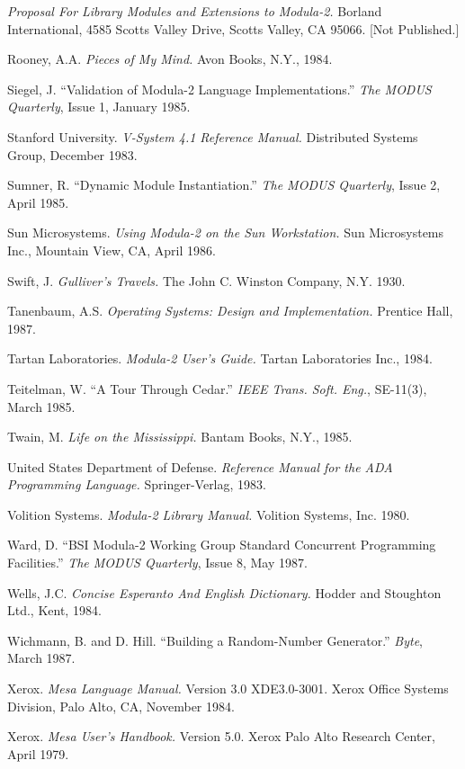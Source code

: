 {\em Proposal For Library Modules and Extensions to Modula-2.} Borland
International, 4585 Scotts Valley Drive, Scotts Valley, CA 95066. [Not
Published.]
\smallskip

Rooney, A.A. {\em Pieces of My Mind.} Avon Books, N.Y., 1984.
\smallskip

Siegel, J. ``Validation of Modula-2 Language Implementations.''
{\em The MODUS Quarterly}, Issue 1, January 1985.
\smallskip 

Stanford University.  {\em V-System 4.1 Reference Manual.} Distributed 
Systems Group, December 1983.
\smallskip

Sumner, R. ``Dynamic Module Instantiation.'' {\em The MODUS Quarterly}, 
Issue 2, April 1985.  
\smallskip

Sun Microsystems. {\em Using Modula-2 on the Sun Workstation.} Sun 
Microsystems Inc., Mountain View, CA, April 1986.
\smallskip

Swift, J. {\em Gulliver's Travels.} The John C. Winston Company, N.Y. 1930.
\smallskip

Tanenbaum, A.S.  {\em Operating Systems: Design and Implementation.}
Prentice Hall, 1987.
\smallskip

Tartan Laboratories.  {\em Modula-2 User's Guide.} Tartan Laboratories 
Inc., 1984.
\smallskip

Teitelman, W. ``A Tour Through Cedar.'' {\em IEEE Trans. Soft. Eng.}, SE-11(3), 
March 1985.
\smallskip

Twain, M. {\em Life on the Mississippi.} Bantam Books, N.Y., 1985.
\smallskip

United States Department of Defense.  {\em Reference Manual for the ADA
Programming Language.} Springer-Verlag, 1983.
\smallskip

Volition Systems. {\em Modula-2 Library Manual.} Volition Systems, Inc. 1980.
\smallskip

Ward, D. ``BSI Modula-2 Working Group Standard Concurrent Programming 
Facilities.'' {\em The MODUS Quarterly}, Issue 8, May 1987.
\smallskip

Wells, J.C. {\em Concise Esperanto And English Dictionary.} Hodder and
Stoughton Ltd., Kent, 1984.
\smallskip

Wichmann, B. and D. Hill. ``Building a Random-Number Generator.''
{\em Byte}, March 1987.
\smallskip

Xerox. {\em Mesa Language Manual.} Version 3.0 XDE3.0-3001. 
Xerox Office Systems Division, Palo Alto, CA, November 1984.
\smallskip

Xerox. {\em Mesa User's Handbook.} Version 5.0. Xerox Palo Alto 
Research Center, April 1979.
\smallskip
